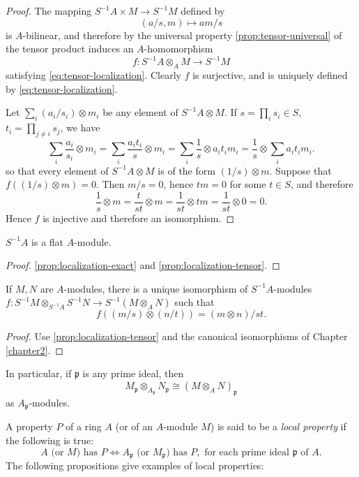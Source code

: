 \begin{proof}
The mapping $S^{-1}A \times M \to S^{-1}M$ defined by
\[
    (a/s, m) \mapsto am/s
\]
is $A$-bilinear, and therefore by the universal property \eqref{prop:tensor-universal} of the tensor product induces an $A$-homomorphism
\[
    f \colon S^{-1}A \otimes_A M \to S^{-1}M
\]
satisfying \eqref{eq:tensor-localization}. Clearly $f$ is surjective, and is uniquely defined by \eqref{eq:tensor-localization}.

Let $\sum_i (a_i/s_i) \otimes m_i$ be any element of $S^{-1}A \otimes M$. If $s = \prod_i s_i \in S$, $t_i = \prod_{j \neq i} s_j$, we have
\[
    \sum_i \frac{a_i}{s_i} \otimes m_i = \sum_i \frac{a_i t_i}{s} \otimes m_i = \sum_i \frac{1}{s} \otimes a_i t_i m_i = \frac{1}{s} \otimes \sum_i a_i t_i m_i.
\]
so that every element of $S^{-1}A \otimes M$ is of the form $(1/s) \otimes m$. Suppose that $f((1/s) \otimes m) = 0$. Then $m/s = 0$, hence $tm = 0$ for some $t \in S$, and therefore
\[
    \frac{1}{s} \otimes m = \frac{t}{st} \otimes m = \frac{1}{st} \otimes tm = \frac{1}{st} \otimes 0 = 0.
\]
Hence $f$ is injective and therefore an isomorphism.
\end{proof}

\begin{corollary}\label{cor:flat-localization}
$S^{-1}A$ is a flat $A$-module.
\end{corollary}

\begin{proof}
    \eqref{prop:localization-exact} and \eqref{prop:localization-tensor}.
\end{proof}

\begin{proposition}\label{prop:localization-tensor-product}
If $M, N$ are $A$-modules, there is a unique isomorphism of $S^{-1}A$-modules $f \colon S^{-1}M \otimes_{S^{-1}A} S^{-1}N \to S^{-1}(M \otimes_A N)$ such that
\[
    f((m/s) \otimes (n/t)) = (m \otimes n)/st.
\]
\end{proposition}

\begin{proof}
    Use \eqref{prop:localization-tensor} and the canonical isomorphisms of Chapter \ref{chapter2}.
\end{proof}

In particular, if $\mathfrak{p}$ is any prime ideal, then
\[
    M_{\mathfrak{p}} \otimes_{A_{\mathfrak{p}}} N_{\mathfrak{p}} \cong (M \otimes_A N)_{\mathfrak{p}}
\]
as $A_{\mathfrak{p}}$-modules.

A property $P$ of a ring $A$ (or of an $A$-module $M$) is said to be a \emph{local property} if the following is true:
\[
    A \text{ (or } M) \text{ has } P \iff A_{\mathfrak{p}} \text{ (or } M_{\mathfrak{p}}) \text{ has } P, \text{ for each prime ideal } \mathfrak{p} \text{ of } A.
\]
The following propositions give examples of local properties:

